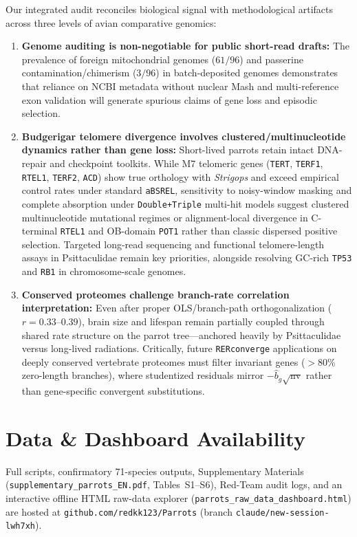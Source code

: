 \documentclass[10pt,a4paper,twocolumn]{article}
\begin{document}
Our integrated audit reconciles biological signal with methodological artifacts across three levels of avian comparative genomics:
\begin{enumerate}
    \item \textbf{Genome auditing is non-negotiable for public short-read drafts:} The prevalence of foreign mitochondrial genomes ($61/96$) and passerine contamination/chimerism ($3/96$) in batch-deposited genomes demonstrates that reliance on NCBI metadata without nuclear Mash and multi-reference exon validation will generate spurious claims of gene loss and episodic selection.
    \item \textbf{Budgerigar telomere divergence involves clustered/multinucleotide dynamics rather than gene loss:} Short-lived parrots retain intact DNA-repair and checkpoint toolkits. While M7 telomeric genes (\texttt{TERT}, \texttt{TERF1}, \texttt{RTEL1}, \texttt{TERF2}, \texttt{ACD}) show true orthology with \textit{Strigops} and exceed empirical control rates under standard \texttt{aBSREL}, sensitivity to noisy-window masking and complete absorption under \texttt{Double+Triple} multi-hit models suggest clustered multinucleotide mutational regimes or alignment-local divergence in C-terminal \texttt{RTEL1} and OB-domain \texttt{POT1} rather than classic dispersed positive selection. Targeted long-read sequencing and functional telomere-length assays in Psittaculidae remain key priorities, alongside resolving GC-rich \texttt{TP53} and \texttt{RB1} in chromosome-scale genomes.
    \item \textbf{Conserved proteomes challenge branch-rate correlation interpretation:} Even after proper OLS/branch-path orthogonalization ($r = 0.33$--$0.39$), brain size and lifespan remain partially coupled through shared rate structure on the parrot tree—anchored heavily by Psittaculidae versus long-lived radiations. Critically, future \texttt{RERconverge} applications on deeply conserved vertebrate proteomes must filter invariant genes ($>80\%$ zero-length branches), where studentized residuals mirror $-\hat{b}_g\sqrt{\text{nv}}$ rather than gene-specific convergent substitutions.
\end{enumerate}

\section*{Data \& Dashboard Availability}
Full scripts, confirmatory 71-species outputs, Supplementary Materials (\texttt{supplementary\_parrots\_EN.pdf}, Tables~S1--S6), Red-Team audit logs, and an interactive offline HTML raw-data explorer (\texttt{parrots\_raw\_data\_dashboard.html}) are hosted at \texttt{github.com/redkk123/Parrots} (branch \texttt{claude/new-session-lwh7xh}).
\end{document}
